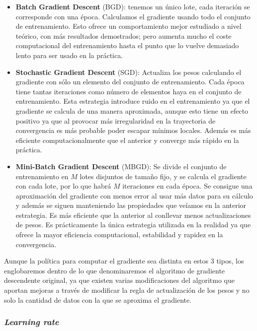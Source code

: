 \begin{itemize}
    \item \textbf{Batch Gradient Descent} (BGD): tenemos un único lote, cada iteración se corresponde con una época. Calculamos el gradiente usando todo el conjunto de entrenamiento. Esto ofrece un comportamiento mejor estudiado a nivel teórico, con más resultados demostrados; pero aumenta mucho el coste computacional del entrenamiento hasta el punto que lo vuelve demasiado lento para ser usado en la práctica.

    \item \textbf{Stochastic Gradient Descent} (SGD): Actualiza los pesos calculando el gradiente con sólo un elemento del conjunto de entrenamiento. Cada época tiene tantas iteraciones como número de elementos haya en el conjunto de entrenamiento. Esta estrategia introduce ruido en el entrenamiento ya que el gradiente se calcula de una manera aproximada, aunque esto tiene un efecto positivo ya que al provocar más irregularidad en la trayectoria de convergencia es más probable poder escapar mínimos locales. Además es más eficiente computacionalmente que el anterior y converge más rápido en la práctica.

    \item \textbf{Mini-Batch Gradient Descent} (MBGD): Se divide el conjunto de entrenamiento en $M$ lotes disjuntos de tamaño fijo, y se calcula el gradiente con cada lote, por lo que habrá $M$ iteraciones en cada época. Se consigue una aproximación del gradiente con menos error al usar más datos para su cálculo y además se siguen manteniendo las propiedades que veíamos en la anterior estrategia. Es más eficiente que la anterior al conllevar menos actualizaciones de pesos. Es prácticamente la única estrategia utilizada en la realidad ya que ofrece la mayor eficiencia computacional, estabilidad y rapidez en la convergencia.
\end{itemize}

Aunque la política para computar el gradiente sea distinta en estos 3 tipos, los englobaremos dentro de lo que denominaremos el algoritmo de gradiente descendente original, ya que existen varias modificaciones del algoritmo que aportan mejoras a través de modificar la regla de actualización de los pesos y no solo la cantidad de datos con la que se aproxima el gradiente.

\subsubsection{\textit{Learning rate}}

